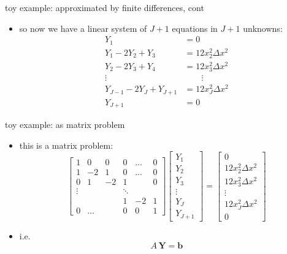 \documentclass[10pt,hyperref]{beamer}
\newcommand{\bb}{\mathbf{b}}
\newcommand{\bY}{\mathbf{Y}}
\begin{document}
\begin{frame}{toy example: approximated by finite differences, cont} 

\begin{itemize}
\item so now we have a linear system of $J+1$ equations in $J+1$ unknowns:
\begin{align*}
Y_1 & = 0 \\
Y_1 - 2 Y_2 + Y_3 &= 12 x_2^2 \Delta x^2 \\
Y_2 - 2 Y_3 + Y_4 &= 12 x_3^2 \Delta x^2 \\
\vdots &\qquad \vdots \\
Y_{J-1} - 2 Y_J + Y_{J+1} &= 12 x_J^2 \Delta x^2 \\
Y_{J+1} &= 0
\end{align*}
\end{itemize}
\end{frame}


\begin{frame}{toy example: as matrix problem} 

\begin{itemize}
\item this is a matrix problem:
   $$\begin{bmatrix}
   1  &  0 &  0 & 0 & \dots & 0 \\
   1  & -2 &  1 & 0 & \dots & 0 \\
   0  &  1 & -2 & 1 &       & 0 \\
   \vdots &&    & \ddots &   &  \\
      &    &    &  1 &    -2 & 1 \\
   0  & \dots & &  0 &     0 & 1
   \end{bmatrix}
   \begin{bmatrix}
   Y_1 \\ Y_2 \\ Y_3 \\ \vdots \\ Y_J \\ Y_{J+1}
   \end{bmatrix}
   =
   \begin{bmatrix}
   0 \\ 12 x_2^2 \Delta x^2 \\ 12 x_3^2 \Delta x^2 \\ \vdots \\ 12 x_J^2 \Delta x^2 \\ 0
   \end{bmatrix} $$
\bigskip


\item i.e.
	$$A\,\bY = \bb$$
\end{itemize}
\end{frame}
\end{document}
